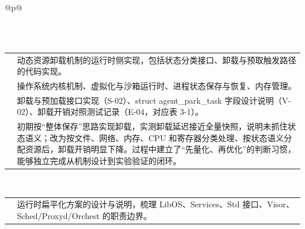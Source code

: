 \FloatBarrier
\begingroup\linespread{1}\selectfont
\setcounter{table}{2}
\begin{longtable}{@{}p{\linewidth}@{}}
\caption{学生个人成长记录表}\label{tab:2-3}\\
\endfirsthead
{}\\[4pt]
\endhead
\endfoot\endlastfoot
\begin{minipage}{\linewidth}
\begin{tabular}{@{}>{\raggedright\arraybackslash}p{}>{\raggedright\arraybackslash}p{}@{}}
\hline
\rowcolor{WordTableHeader}\multicolumn{2}{@{}p{\linewidth}@{}}{\RecordHeading{姓名与专业：陈奕池\quad 2026 级博士\quad 软件工程}} \\ \hline
\rowcolor{white} \TableHeaderText{承担任务} & 动态资源卸载机制的运行时侧实现，包括状态分类接口、卸载与预取触发路径的代码实现。 \\ \hline
\rowcolor{white} \TableHeaderText{使用的专业知识} & 操作系统内核机制、虚拟化与沙箱运行时、进程状态保存与恢复、内存管理。 \\ \hline
\rowcolor{white} \TableHeaderText{交付成果与材料编号} & 卸载与预加载接口实现（S-02）、struct agent\_park\_task 字段设计说明（V-02）、卸载开销对照测试记录（E-04，对应表 3-1）。 \\ \hline
\rowcolor{white} \TableHeaderText{遇到的问题与能力提升} & 初期按“整体保存”思路实现卸载，实测卸载延迟接近全量快照，说明未抓住状态语义；改为按文件、网络、内存、CPU 和寄存器分类处理、按状态语义分配资源后，卸载开销明显下降。过程中建立了“先量化、再优化”的判断习惯，能够独立完成从机制设计到实验验证的闭环。 \\ \hline
\end{tabular}
\end{minipage} \\[6pt]
\begin{minipage}{\linewidth}
\begin{tabular}{@{}>{\raggedright\arraybackslash}p{}>{\raggedright\arraybackslash}p{}@{}}
\hline
\rowcolor{WordTableHeader}\multicolumn{2}{@{}p{\linewidth}@{}}{\RecordHeading{姓名与专业：张思淼\quad 2025 级本科\quad 软件工程}} \\ \hline
\rowcolor{white} \TableHeaderText{承担任务} & 运行时扁平化方案的设计与说明，梳理 LibOS、Services、Std 接口、Visor、Sched/\allowbreak{}Proxyd/\allowbreak{}Orchest 的职责边界。 \\ \hline

\end{tabular}
\end{minipage}
\end{longtable}

